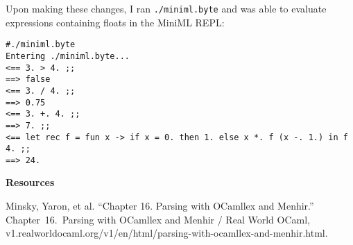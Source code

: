 \documentclass[12pt]{extarticle}
\begin{document}
\vspace{0.3cm}
\normalsize
Upon making these changes, I ran \texttt{./miniml.byte} and was able to evaluate expressions containing floats in the MiniML REPL:

\vspace{0.3cm}
\footnotesize
{}
\begin{verbatim}
#./miniml.byte
Entering ./miniml.byte...
<== 3. > 4. ;;
==> false
<== 3. / 4. ;;
==> 0.75
<== 3. +. 4. ;;
==> 7. ;;
<== let rec f = fun x -> if x = 0. then 1. else x *. f (x -. 1.) in f 4. ;;
==> 24.
\end{verbatim}

\vspace{0.3cm}
\begin{center}
    \Large
    \textbf{Resources}
\end{center}
\vspace{0.3cm}

\normalsize
Minsky, Yaron, et al. “Chapter 16. Parsing with OCamllex and Menhir.” Chapter 16. Parsing with OCamllex and Menhir / Real World OCaml, v1.realworldocaml.org/v1/en/html/parsing-with-ocamllex-and-menhir.html.
\end{document}

